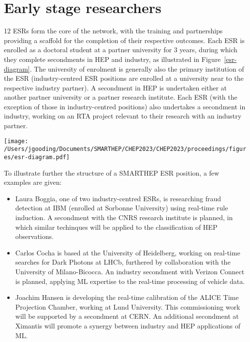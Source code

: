 \section{Early stage researchers}
\label{esrs}
12 ESRs form the core of the network, with the training and partnerships providing a scaffold for the completion of their respective outcomes. Each ESR is enrolled as a doctoral student at a partner university for 3 years, during which they complete secondments in HEP and industry, as illustrated in Figure~\ref{esr-diagram}. The university of enrolment is generally also the primary institution of the ESR (industry-centred ESR positions are enrolled at a university near to the respective industry partner). A secondment in HEP is undertaken either at another partner university or a partner research institute. Each ESR (with the exception of those in industry-centred positions) also undertakes a secondment in industry, working on an RTA project relevant to their research with an industry partner.

\begin{figure*}[h!]
    \centering
    \texttt{[image: /Users/jgooding/Documents/SMARTHEP/CHEP2023/CHEP2023/proceedings/figures/esr-diagram.pdf]}
    \caption{Structure of a SMARTHEP ESR position. Each ESR is enrolled (i.), during which they will undertake secondments with network partners in HEP (ii.) and industry (iii.). Through the combination of primary and secondment work, each ESR will complete goals in HEP (iv.) and industry (v.), discussed in further detail in Section~\ref{goals}. Precise durations of the secondments vary between ESR positions.}
    \label{esr-diagram}
\end{figure*}

To illustrate further the structure of a SMARTHEP ESR position, a few examples are given:
\begin{itemize}
    \item  Laura Boggia, one of two industry-centred ESRs, is researching fraud detection at IBM (enrolled at Sorbonne University) using real-time rule induction. A secondment with the CNRS research institute is planned, in which similar techinques will be applied to the classification of HEP observations. 
    \item Carlos Cocha is based at the University of Heidelberg, working on real-time searches for Dark Photons at LHCb, furthered by collaboration with the University of Milano-Bicocca. An industry secondment with Verizon Connect is planned, applying ML expertise to the real-time processing of vehicle data.
    \item Joachim Hansen is developing the real-time calibration of the ALICE Time Projection Chamber, working at Lund University. This commissioning work will be supported by a secondment at CERN. An additional secondment at Ximantis will promote a synergy between industry and HEP applications of ML.
\end{itemize}